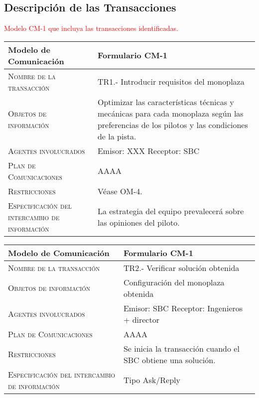 \documentclass[12pt,a4paper,twoside,spanish]{article}      %
\begin{document}
\subsection{Descripción de las Transacciones}
\textcolor {red} {Modelo CM-1 que incluya las transacciones identificadas.}

\begin{table}[H]
\scriptsize
\begin{tabularx}{\textwidth}{|l|X|} \hline
\textbf{Modelo de Comunicación} & \textbf{Formulario CM-1} \\ \hline\hline

\textsc{Nombre de la transacción} & TR1.- Introducir requisitos del monoplaza

\\ \hline
\textsc{Objetos de información} &

    Optimizar las características técnicas y mecánicas para cada monoplaza según las preferencias de los pilotos y las condiciones de la pista.
\\ \hline
\textsc{Agentes involucrados} &  Emisor: XXX
                                 Receptor: SBC\\ \hline
\textsc{Plan de Comunicaciones} &  AAAA
\\ \hline
\textsc{Restricciones} &  Véase OM-4. \\ \hline
\textsc{Especificación del intercambio de información} &  La estrategia del equipo prevalecerá sobre las opiniones del piloto.\\ \hline
\end{tabularx}
  \label{tab.CM1_1}
\end{table}


\begin{table}[H]
\scriptsize
\begin{tabularx}{\textwidth}{|l|X|} \hline
\textbf{Modelo de Comunicación} & \textbf{Formulario CM-1} \\ \hline\hline

\textsc{Nombre de la transacción} & TR2.- Verificar solución obtenida

\\ \hline
\textsc{Objetos de información} & Configuración del monoplaza obtenida
\\ \hline
\textsc{Agentes involucrados} &  Emisor: SBC
                                 Receptor: Ingenieros + director \\ \hline
\textsc{Plan de Comunicaciones} &  AAAA
\\ \hline
\textsc{Restricciones} &  Se inicia la transacción cuando el SBC obtiene una solución. \\ \hline
\textsc{Especificación del intercambio de información} &  Tipo Ask/Reply\\ \hline
\end{tabularx}
  \label{tab.CM1_2}
\end{table}
\end{document}
